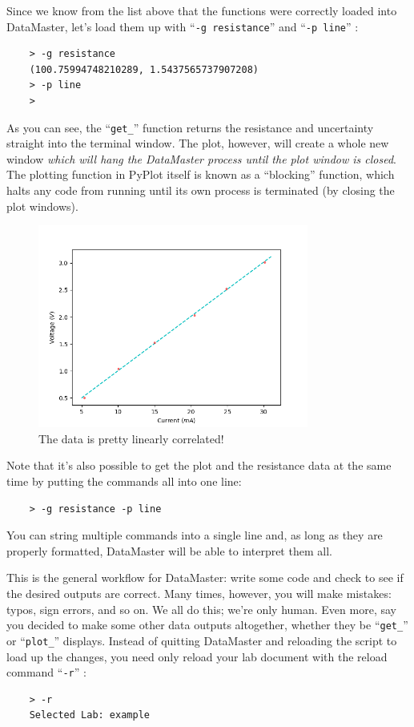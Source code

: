 \documentclass[12pt]{article}
\begin{document}
{Since we know from the list above that the functions were correctly loaded into DataMaster, let's load them up with ``\texttt{-g resistance}'' and ``\texttt{-p line}'' : 
\begin{framed}
  \begin{lstlisting}
    > -g resistance
    (100.75994748210289, 1.5437565737907208)
    > -p line
    > 
  \end{lstlisting}
\end{framed}
As you can see, the ``\texttt{get\_}'' function returns the resistance and uncertainty straight into the terminal window. The plot, however, will create a whole new window \textit{which will hang the DataMaster process until the plot window is closed}. The plotting function in PyPlot itself is known as a ``blocking'' function, which halts any code from running until its own process is terminated (by closing the plot windows).

\begin{figure}[!ht]
  \centering
    \includegraphics[width=3.5in]{assets/line.png}
  \caption{\textsf{The data is pretty linearly correlated!}}
  \label{fig:ex_line}
\end{figure}

Note that it's also possible to get the plot and the resistance data at the same time by putting the commands all into one line:
\begin{framed}
  \begin{lstlisting}
    > -g resistance -p line
  \end{lstlisting}
\end{framed}
You can string multiple commands into a single line and, as long as they are properly formatted, DataMaster will be able to interpret them all.

This is the general workflow for DataMaster: write some code and check to see if the desired outputs are correct. Many times, however, you will make mistakes: typos, sign errors, and so on. We all do this; we're only human. Even more, say you decided to make some other data outputs altogether, whether they be ``\texttt{get\_}'' or ``\texttt{plot\_}'' displays. Instead of quitting DataMaster and reloading the script to load up the changes, you need only reload your lab document with the reload command ``\texttt{-r}'' : 
\begin{framed}
  \begin{lstlisting}
    > -r
    Selected Lab: example


\end{lstlisting}
\end{framed}}
\end{document}
